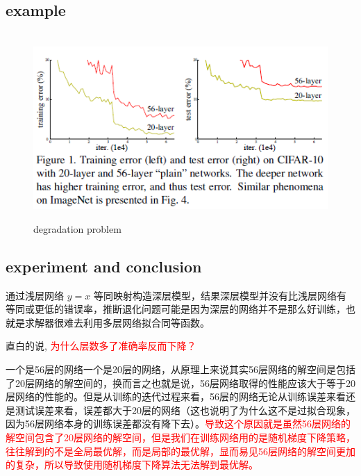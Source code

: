 \documentclass[12pt]{ctexart}%
\begin{document}
		\subsection{\quad example} 
			\begin{figure}[H]
				\vspace{-0.2cm}  %
				\setlength{\abovecaptionskip}{-0.2cm}   %
				\centering
				\includegraphics[scale=1]{degradation_problem.png}
				\renewcommand{\figurename}{Fig} %
				\caption{degradation problem}
				\label{fig1:example}
			\end{figure}
		
		\subsection{\quad experiment and conclusion} 
			通过浅层网络 $y=x$ 等同映射构造深层模型，结果深层模型并没有比浅层网络有等同或更低的错误率，推断退化问题可能是因为深层的网络并不是那么好训练，也就是求解器很难去利用多层网络拟合同等函数。
			
			直白的说, \textcolor{red}{为什么层数多了准确率反而下降？}
			
			一个是56层的网络一个是20层的网络，从原理上来说其实56层网络的解空间是包括了20层网络的解空间的，换而言之也就是说，56层网络取得的性能应该大于等于20层网络的性能的。但是从训练的迭代过程来看，56层的网络无论从训练误差来看还是测试误差来看，误差都大于20层的网络（这也说明了为什么这不是过拟合现象，因为56层网络本身的训练误差都没有降下去）。\textcolor{red}{导致这个原因就是虽然56层网络的解空间包含了20层网络的解空间，但是我们在训练网络用的是随机梯度下降策略，往往解到的不是全局最优解，而是局部的最优解，显而易见56层网络的解空间更加的复杂，所以导致使用随机梯度下降算法无法解到最优解。}
\end{document}
